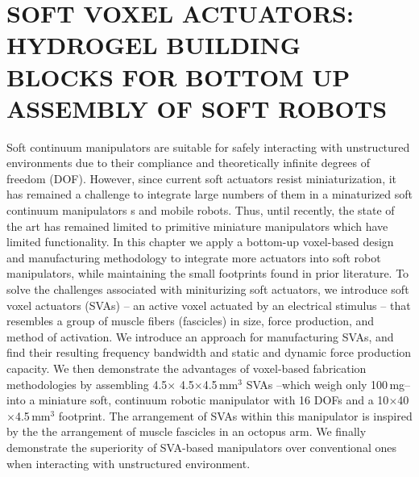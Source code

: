 \graphicspath{{Images/SVAs/}}

\chapter{SOFT VOXEL ACTUATORS: HYDROGEL BUILDING BLOCKS FOR BOTTOM UP ASSEMBLY OF SOFT ROBOTS}
\label{chap:SVAs}
Soft continuum manipulators are suitable for safely interacting with unstructured environments due to their compliance and theoretically infinite degrees of freedom (DOF). However, since current soft actuators resist miniaturization, it has remained a challenge to integrate large numbers of them in a minaturized soft continuum manipulators s and mobile robots. Thus, until recently, the state of the art has remained limited to primitive miniature manipulators which have limited functionality. In this chapter we apply a bottom-up voxel-based design and manufacturing methodology to integrate more actuators into soft robot manipulators, while maintaining the small footprints found in prior literature. To solve the challenges associated with miniturizing soft actuators, we introduce soft voxel actuators (SVAs) -- an active voxel actuated by an electrical stimulus -- that resembles a group of muscle fibers (fascicles) in size, force production, and method of activation. We introduce an approach for manufacturing SVAs, and find their resulting frequency bandwidth and static and dynamic force production capacity. We then demonstrate the advantages of voxel-based fabrication methodologies by assembling 4.5$\times$ 4.5$\times$4.5\,mm$^3$ SVAs --which weigh only 100\,mg-- into a miniature soft, continuum robotic manipulator with 16 DOFs and a 10$\times$40$\times$4.5\,mm$^3$ footprint. The arrangement of SVAs within this manipulator is inspired by the the arrangement of muscle fascicles in an octopus arm. We finally demonstrate the superiority of SVA-based manipulators over conventional ones when interacting with unstructured environment. 
